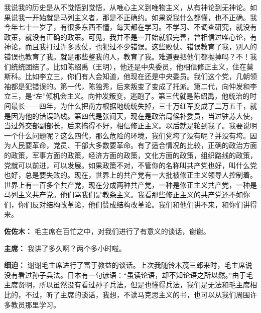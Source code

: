 \begin{duihua}
我说我的历史是从不觉悟到觉悟，从唯心主义到唯物主义，从有神论到无神论。如果说我一开始就是马列主义者，那是不正确约。如果说我什么都懂，也不正确。我今年七十一岁了，有很多东西不懂，每天都在学习。不学习、不调查研究，就没有政策，就没有正确的政策。可见，我并不是一开始就很完善，曾相信过唯心论，有神论，而且我打过许多败仗，也犯过不少错误。这些败仗、错误教育了我，别人的错误也教育了我。就是那些整我的人，教育了我。难道要把他们都抛掉吗？不！我们统统团结了。比如陈绍禹（王明），他还是中央委员，他相信修正主义，住在莫斯科。比如李立三，你们有人会知道，他现在还是中央委员。我们这个党，几朝领袖都是犯错误的。第一代，陈独秀，后来叛变了变成了托派。第二代，向仲发和李立三，是“左”倾机会主义。向仲发叛变，逃跑了。第三代就是陈绍禹，他统治的时间最长——四年，为什么把南方根据地统统失掉，三十万红军变成了二万五千，就是因为他的错误路线。第四代是张闻天，现在是政治局候补委员，当过驻苏大使，当过外交部副部长，后来搞得不好，相信修正主义。以后就是轮到我了。我要说明一个什么问题呢？这么四代，那么危险的环境，我们党垮了没有呢？并没有垮。因为人民要革命，党员、干部大多数要革命。有了适合情况的比较，正确的政治方面的政策，军事方面的政策，经济方面的政策，文化方面的政策，组织路线的政策，党就可以前进，可以发展。如果政策不对，不管你的名称叫共产党也好，叫什么党也好，总是要失败的。现在，世界上的共产党有一大批被修正主义领导人控制着。世界上有一百多个共产党，现在分成两种共产党，一种是修正主义共产党，一种是马列主义共产党。他们骂我们是教条主义。我看那些修正主义的共产党还不如你们，你们反对结构改革论，他们赞成结构改革论。我们和他们讲不来，和你们讲得来。

\item[\textbf{佐佐木：}] 毛主席在百忙之中，对我们进行了有意义的谈话，谢谢。

\item[\textbf{主席：}] 我讲了多久啊？两个多小时啦。

\item[\textbf{细迫：}] 谢谢毛主席进行了富于教益的谈话。上次我随铃木茂三郎来时，毛主席说没有看过孙子兵法。日本有一句谚语：“虽读论语，却不知论语之所以然。”由于毛主席贤明，所以虽然没有看过孙子兵法，但是也懂得兵法，我们是无法和毛主席相比的，不过，听了主席的谈话，我想，不读马克思主义的书，也可以从我们周围许多教员那里学习。


\end{duihua}
